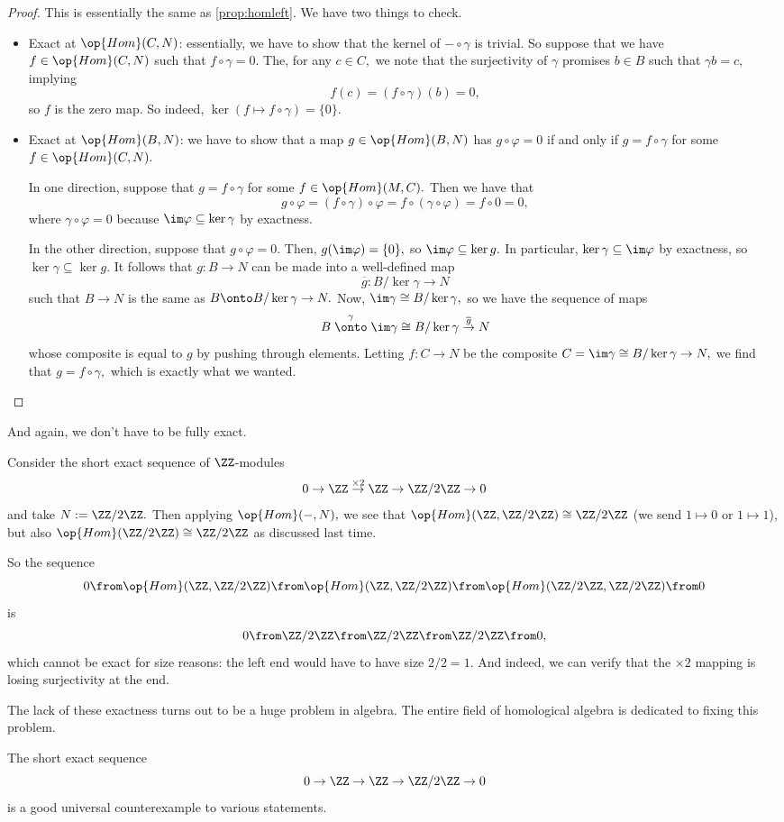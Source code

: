 \documentclass[../notes.tex]{subfiles}
\begin{document}
\begin{proof}
	This is essentially the same as \autoref{prop:homleft}. We have two things to check.
	\begin{itemize}
		\item Exact at $\op{Hom}(C,N)$: essentially, we have to show that the kernel of $-\circ\gamma$ is trivial. So suppose that we have $f\in\op{Hom}(C,N)$ such that $f\circ\gamma=0.$ The, for any $c\in C,$ we note that the surjectivity of $\gamma$ promises $b\in B$ such that $\gamma b=c,$ implying
		\[f(c)=(f\circ\gamma)(b)=0,\]
		so $f$ is the zero map. So indeed, $\ker(f\mapsto f\circ\gamma)=\{0\}.$

		\item Exact at $\op{Hom}(B,N)$: we have to show that a map $g\in\op{Hom}(B,N)$ has $g\circ\varphi=0$ if and only if $g=f\circ\gamma$ for some $f\in\op{Hom}(C,N).$

		In one direction, suppose that $g=f\circ\gamma$ for some $f\in\op{Hom}(M,C).$ Then we have that
		\[g\circ\varphi=(f\circ\gamma)\circ\varphi=f\circ(\gamma\circ\varphi)=f\circ0=0,\]
		where $\gamma\circ\varphi=0$ because $\im\varphi\subseteq\ker\gamma$ by exactness.

		In the other direction, suppose that $g\circ\varphi=0.$ Then, $g(\im\varphi)=\{0\},$ so $\im\varphi\subseteq\ker g.$ In particular, $\ker\gamma\subseteq\im\varphi$ by exactness, so $\ker\gamma\subseteq\ker g.$ It follows that $g:B\to N$ can be made into a well-defined map
		\[\overline g:B/\ker\gamma\to N\]
		such that $B\to N$ is the same as $B\onto B/\ker\gamma\to N.$ Now, $\im\gamma\cong B/\ker\gamma,$ so we have the sequence of maps
		\[B\stackrel\gamma\onto\im\gamma\cong B/\ker\gamma\stackrel{\overline g}\to N\]
		whose composite is equal to $g$ by pushing through elements. Letting $f:C\to N$ be the composite $C=\im\gamma\cong B/\ker\gamma\to N,$ we find that $g=f\circ\gamma,$ which is exactly what we wanted.
		\qedhere
	\end{itemize}
\end{proof}
And again, we don't have to be fully exact.
\begin{example}
	Consider the short exact sequence of $\ZZ$-modules
	\[0\to\ZZ\stackrel{\times2}\to\ZZ\to\ZZ/2\ZZ\to0\]
	and take $N:=\ZZ/2\ZZ.$ Then applying $\op{Hom}(-,N),$ we see that $\op{Hom}(\ZZ,\ZZ/2\ZZ)\cong\ZZ/2\ZZ$ (we send $1\mapsto0$ or $1\mapsto1$), but also $\op{Hom}(\ZZ/2\ZZ)\cong\ZZ/2\ZZ$ as discussed last time.
	
	So the sequence
	\[0\from\op{Hom}(\ZZ,\ZZ/2\ZZ)\from\op{Hom}(\ZZ,\ZZ/2\ZZ)\from\op{Hom}(\ZZ/2\ZZ,\ZZ/2\ZZ)\from0\]
	is
	\[0\from\ZZ/2\ZZ\from\ZZ/2\ZZ\from\ZZ/2\ZZ\from0,\]
	which cannot be exact for size reasons: the left end would have to have size $2/2=1.$ And indeed, we can verify that the $\times2$ mapping is losing surjectivity at the end.
\end{example}
The lack of these exactness turns out to be a huge problem in algebra. The entire field of homological algebra is dedicated to fixing this problem.
\begin{remark}
	The short exact sequence
	\[0\to\ZZ\to\ZZ\to\ZZ/2\ZZ\to0\]
	is a good universal counterexample to various statements.
\end{remark}
\end{document}
